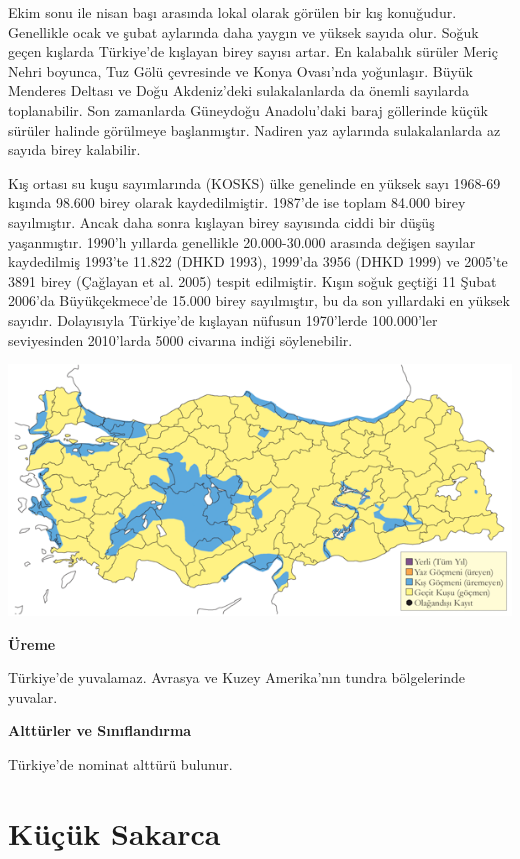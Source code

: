 \documentclass[
  letterpaper,
  DIV=11,
  numbers=noendperiod]{scrreprt}
\begin{document}
Ekim sonu ile nisan başı arasında lokal olarak görülen bir kış
konuğudur. Genellikle ocak ve şubat aylarında daha yaygın ve yüksek
sayıda olur. Soğuk geçen kışlarda Türkiye'de kışlayan birey sayısı
artar. En kalabalık sürüler Meriç Nehri boyunca, Tuz Gölü çevresinde ve
Konya Ovası'nda yoğunlaşır. Büyük Menderes Deltası ve Doğu Akdeniz'deki
sulakalanlarda da önemli sayılarda toplanabilir. Son zamanlarda
Güneydoğu Anadolu'daki baraj göllerinde küçük sürüler halinde görülmeye
başlanmıştır. Nadiren yaz aylarında sulakalanlarda az sayıda birey
kalabilir.

Kış ortası su kuşu sayımlarında (KOSKS) ülke genelinde en yüksek sayı
1968-69 kışında 98.600 birey olarak kaydedilmiştir. 1987'de ise toplam
84.000 birey sayılmıştır. Ancak daha sonra kışlayan birey sayısında
ciddi bir düşüş yaşanmıştır. 1990'lı yıllarda genellikle 20.000-30.000
arasında değişen sayılar kaydedilmiş 1993'te 11.822 (DHKD 1993), 1999'da
3956 (DHKD 1999) ve 2005'te 3891 birey (Çağlayan et al. 2005) tespit
edilmiştir. Kışın soğuk geçtiği 11 Şubat 2006'da Büyükçekmece'de 15.000
birey sayılmıştır, bu da son yıllardaki en yüksek sayıdır. Dolayısıyla
Türkiye'de kışlayan nüfusun 1970'lerde 100.000'ler seviyesinden
2010'larda 5000 civarına indiği söylenebilir.

\includegraphics{images/harita_Page_003.png}

\textbf{Üreme}

Türkiye'de yuvalamaz. Avrasya ve Kuzey Amerika'nın tundra bölgelerinde
yuvalar.

\textbf{Alttürler ve Sınıflandırma}

Türkiye'de nominat alttürü bulunur.

\section{Küçük Sakarca}\label{kuxfcuxe7uxfck-sakarca}
\end{document}
